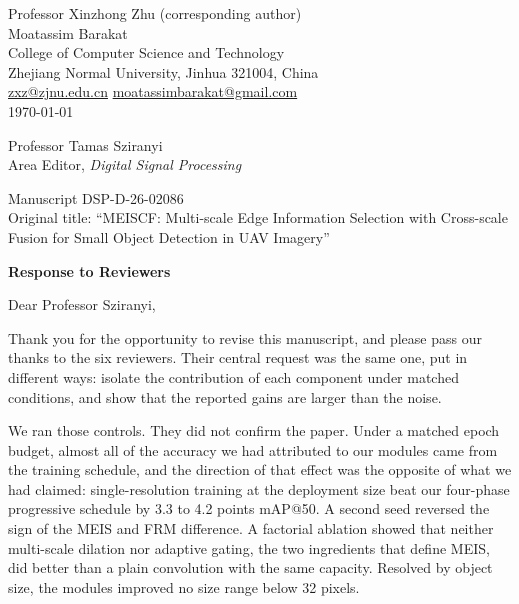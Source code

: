 \documentclass[11pt, a4paper]{article}
\begin{document}
\begin{flushright}
    Professor Xinzhong Zhu \quad (corresponding author) \\
    Moatassim Barakat \\
    College of Computer Science and Technology \\
    Zhejiang Normal University, Jinhua 321004, China \\
    \href{mailto:zxz@zjnu.edu.cn}{zxz@zjnu.edu.cn}
    \quad
    \href{mailto:moatassimbarakat@gmail.com}{moatassimbarakat@gmail.com} \\[4pt]
    \today
\end{flushright}

\bigskip

Professor Tamas Sziranyi \\
Area Editor, \textit{Digital Signal Processing}

\bigskip

Manuscript DSP-D-26-02086 \\
Original title: ``MEISCF: Multi-scale Edge Information Selection with
Cross-scale Fusion for Small Object Detection in UAV Imagery''

\bigskip

\begin{center}
\large\textbf{Response to Reviewers}
\end{center}

\bigskip

Dear Professor Sziranyi,

Thank you for the opportunity to revise this manuscript, and please pass our
thanks to the six reviewers. Their central request was the same one, put in
different ways: isolate the contribution of each component under matched
conditions, and show that the reported gains are larger than the noise.

We ran those controls. They did not confirm the paper. Under a matched epoch
budget, almost all of the accuracy we had attributed to our modules came from the
training schedule, and the direction of that effect was the opposite of what we
had claimed: single-resolution training at the deployment size beat our
four-phase progressive schedule by 3.3 to 4.2 points mAP@50. A second seed
reversed the sign of the MEIS and FRM difference. A factorial ablation showed
that neither multi-scale dilation nor adaptive gating, the two ingredients that
define MEIS, did better than a plain convolution with the same capacity. Resolved
by object size, the modules improved no size range below 32 pixels.
\end{document}
